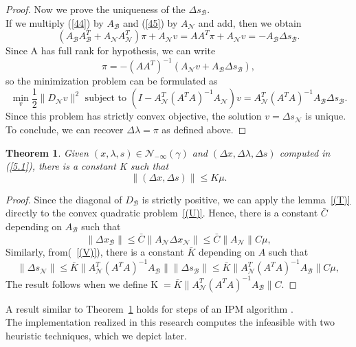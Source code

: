 \documentclass[a4paper,10 pt,titlepage,twoside]{book}
\theoremstyle{plain}
\newtheorem{thm}{Theorem}[chapter]
\theoremstyle{definition}
\theoremstyle{remark}
\begin{document}
\begin{proof}
	Now we prove the uniqueness of the $\Delta s_{\mathcal{B}}$.\\
	If we multiply (\ref{44}) by $A_{\mathcal{B}}$ and (\ref{45}) by $A_{\mathcal{N}}$ and add, then we obtain
	\begin{equation*}
	(A_{\mathcal{B}}A_{\mathcal{B}}^{T}+A_{\mathcal{N}}A_{\mathcal{N}}^{T})\pi+A_{\mathcal{N}}v = AA^{T}\pi+A_{\mathcal{N}}v = -A_{\mathcal{B}}\Delta s_{\mathcal{B}}.
	\end{equation*} 
	Since A has full rank for hypothesis, we can write
	\begin{equation*}
	\pi = -(AA^{T})^{-1}(A_{\mathcal{N}}v +A_{\mathcal{B}}\Delta s_{\mathcal{B}}),
	\end{equation*}
	so the minimization problem can be formulated as
	\begin{equation}\label{(V)}
	\min\limits_{v}\frac{1}{2}\lVert D_{\mathcal{N}}v\rVert^{2} \text{ subject to }
	(I-A_{\mathcal{N}}^{T}(A^{T}A)^{-1}A_{\mathcal{N}})v =A_{\mathcal{N}}^{T}(A^{T}A)^{-1}A_{\mathcal{B}}\Delta s_{\mathcal{B}}.		 
	\end{equation}
	Since this problem  has strictly convex objective, the solution $v=\Delta s_{\mathcal{N}}$ is unique. To conclude, we can recover $\Delta \lambda=\pi$ as defined above. 
\end{proof}
\begin{thm}\label{(Z)}
	Given $(x, \lambda, s)\in\mathcal{N}_{- \infty}(\gamma)$ and $(\Delta x,\Delta \lambda, \Delta s)$ computed in (\ref{5.1}), there is a constant K such that
	\begin{equation*}
	\lVert (\Delta x, \Delta s)\rVert \leq K \mu.
	\end{equation*}
\end{thm}
\begin{proof}
	Since the diagonal of $D_{\mathcal{B}}$ is strictly positive, we can apply the lemma~\ref{(T)} directly to the convex quadratic problem~\ref{(U)}. Hence, there is a constant $\bar{C}$ depending on $A_{\mathcal{B}}$ such that
	\begin{equation}
	\lVert \Delta x_{\mathcal{B}}\rVert \leq \bar{C}\lVert A_{\mathcal{N}}\Delta x_{\mathcal{N}}\rVert\leq \bar{C}\lVert A_{\mathcal{N}}\rVert C\mu,
	\end{equation}
	Similarly, from(~\ref{(V)}), there is a constant $\bar{K}$ depending on $A$ such that
	\begin{equation}
	\lVert \Delta s_{\mathcal{N}}\rVert \leq \bar{K}\lVert A_{\mathcal{N}}^{T}(A^{T}A)^{-1}A_{\mathcal{B}}\rVert\lVert \Delta s_{\mathcal{B}}\rVert \leq\bar{K} \lVert A_{\mathcal{N}}^{T}(A^{T}A)^{-1}A_{\mathcal{B}}\rVert C\mu,
	\end{equation}
	The result follows when we define K$\;=\bar{K} \lVert A_{\mathcal{N}}^{T}(A^{T}A)^{-1}A_{\mathcal{B}}\rVert C$.
\end{proof}
A result similar to Theorem~\ref{(Z)} holds for steps of an IPM algorithm \cite{Wright}.\\ The implementation realized in this research computes the infeasible with two heuristic techniques, which we depict later.\\
\end{document}
